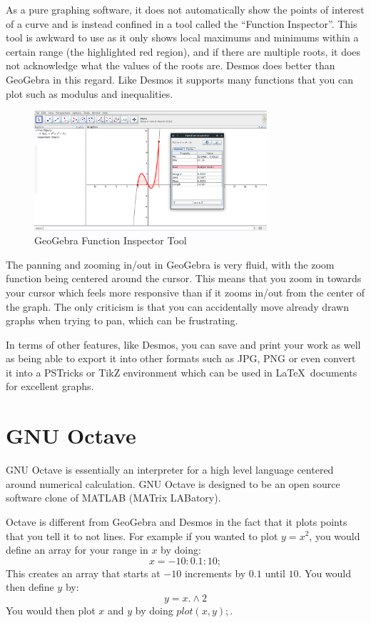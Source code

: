 \documentclass[../../../main.tex]{subfiles}
\begin{document}
As a pure graphing software, it does not automatically show the points of interest of a curve and is instead confined in a tool called the ``Function Inspector''. This tool is awkward to use as it only shows local maximums and minimums within a certain range (the highlighted red region), and if there are multiple roots, it does not acknowledge what the values of the roots are. Desmos does better than GeoGebra in this regard. Like Desmos it supports many functions that you can plot such as modulus and inequalities.
\begin{figure}[H]
	\begin{center}
		\includegraphics[width=0.77\textwidth]{images/geogebraFunc}
	\end{center}
	\caption{GeoGebra Function Inspector Tool}
\end{figure}
The panning and zooming in/out in GeoGebra is very fluid, with the zoom function being centered around the cursor. This means that you zoom in towards your cursor which feels more  responsive than if it zooms in/out from the center of the graph. The only criticism is that you can accidentally move already drawn graphs when trying to pan, which can be frustrating.

In terms of other features, like Desmos, you can save and print your work as well as being able to export it into other formats such as JPG, PNG or even convert it into a PSTricks or TikZ environment which can be used in \LaTeX \ documents for excellent graphs.

\section{GNU Octave}
GNU Octave is essentially an interpreter for a high level language centered around numerical calculation. GNU Octave is designed to be an open source software clone of MATLAB (MATrix LABatory).
\newline

Octave is different from GeoGebra and Desmos in the fact that it plots points that you tell it to not lines. For example if you wanted to plot $y=x^2$, you would define an array for your range in $x$ by doing:
\[x = -10:0.1:10;\]
This creates an array that starts at $-10$ increments by $0.1$ until $10$. You would then define $y$ by:
\[y = x.\wedge 2\]
You would then plot $x$ and $y$ by doing $plot(x,y);$.
\end{document}

